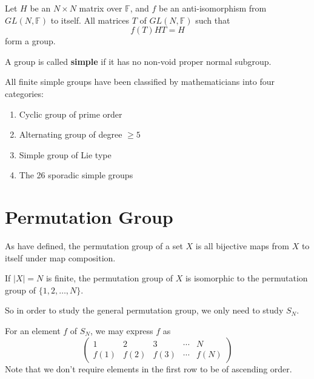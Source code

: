\documentclass[12pt]{book}
\begin{document}
\begin{example}
	Let $H$ be an $N\times N$ matrix over $\mathbb F$, and $f$ be an anti-isomorphism from $GL(N,\mathbb F)$ to itself. All matrices $T$ of $GL(N,\mathbb F)$ such that
	\begin{equation}
		f(T)HT=H
	\end{equation}
	form a group.
\end{example}

\begin{definition}
	A group is called {\bf simple} if it has no non-void proper normal subgroup.
\end{definition}
	
\begin{example}
	All finite simple groups have been classified by mathematicians into four categories:
	\begin{enumerate}
		\item Cyclic group of prime order
		\item Alternating group of degree $\geq5$
		\item Simple group of Lie type
		\item The 26 sporadic simple groups
	\end{enumerate}
\end{example}
	
\section{Permutation Group}
	
	As have defined, the permutation group of a set $X$ is all bijective maps from $X$ to itself under map composition.
	\begin{lemma}
		If $|X|=N$ is finite, the permutation group of $X$ is isomorphic to the permutation group of $\{1,2,\dots,N\}$.
	\end{lemma}
	
	So in order to study the general permutation group, we only need to study $S_N$.
	
\begin{definition}
	For an element $f$ of $S_N$, we may express $f$ as 
	\begin{equation}
		\left(\begin{array}{ccccc}
		1&2&3&\cdots&N\\
		f(1)&f(2)&f(3)&\cdots&f(N)
		\end{array}\right)
	\end{equation}
	Note that we don't require elements in the first row to be of ascending order.
\end{definition}
	
\end{document}
